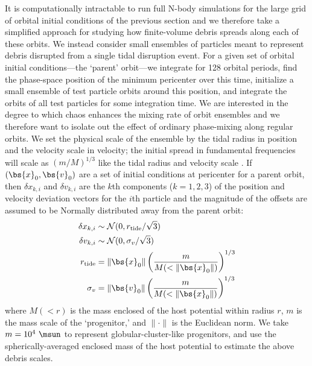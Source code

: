 It is computationally intractable to run full N-body simulations for the large
grid of orbital initial conditions of the previous section and we therefore take
a simplified approach for studying how finite-volume debris spreads along each
of these orbits. We instead consider small ensembles of particles meant to
represent debris disrupted from a single tidal disruption event. For a given set
of orbital initial conditions---the `parent' orbit---we integrate for 128
orbital periods, find the phase-space position of the minimum pericenter over
this time, initialize a small ensemble of test particle orbits around this
position, and integrate the orbits of all test particles for some integration
time. We are interested in the degree to which chaos enhances the mixing rate of
orbit ensembles and we therefore want to isolate out the effect of ordinary
phase-mixing along regular orbits. We set the physical scale of the ensemble by
the tidal radius in position and the velocity scale in velocity; the initial
spread in fundamental frequencies will scale as $(m/M)^{1/3}$ like the tidal
radius and velocity scale \citep[e.g.,][]{johnston98, apw14}. If
$(\bs{x}_0,\bs{v}_0)$ are a set of initial conditions at pericenter for a parent
orbit, then $\delta x_{k,i}$ and $\delta v_{k,i}$ are the $k$th components
($k=1,2,3$) of the position and velocity deviation vectors for the $i$th
particle and the magnitude of the offsets are assumed to be Normally distributed
away from the parent orbit:
\begin{align}
	\delta x_{k,i} &\sim \mathcal{N}(0, r_{\rm tide}/\sqrt{3})\\
	\delta v_{k,i} &\sim \mathcal{N}(0, \sigma_v/\sqrt{3})\\
	r_{\rm tide} &= \|\bs{x}_0\| \left(\frac{m}{M(<\|\bs{x}_0\|)}\right)^{1/3} \\
	\sigma_v &= \|\bs{v}_0\|\left(\frac{m}{M(<\|\bs{x}_0\|)}\right)^{1/3}
\end{align}
where $M(<r)$ is the mass enclosed of the host potential within radius $r$, $m$
is the mass scale of the `progenitor,' and $\|\cdot \|$ is the Euclidean norm.
We take $m=10^4~\msun$ to represent globular-cluster-like progenitors, and use
the spherically-averaged enclosed mass of the host potential to estimate the
above debris scales. %

